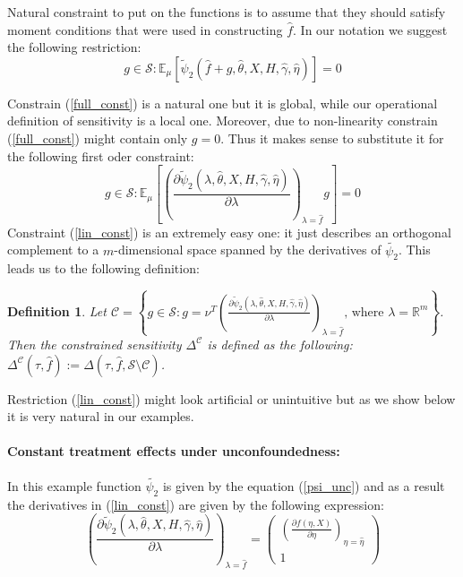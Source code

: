 \documentclass[12pt]{article}
\theoremstyle{plain}
\newtheorem{definition}[theorem]{Definition}
\begin{document}
Natural constraint to put on the functions is to assume that they should satisfy moment conditions that were used in constructing $\hat f$. In our notation we suggest the following restriction:
\begin{equation}\label{full_const}
g\in \mathcal{S}:\mathbb{E}_{\mu}[\tilde{\psi}_2(\hat f + g,\hat\theta, X, H, \hat\gamma, \hat\eta)]= 0
\end{equation}

Constrain (\ref{full_const}) is a natural one but it is global, while our operational definition of sensitivity is a local one. Moreover, due to non-linearity constrain (\ref{full_const}) might contain only $g = 0$. Thus it makes sense to substitute it for the following first oder constraint:
\begin{equation}\label{lin_const}
g\in \mathcal{S}:\mathbb{E}_{\mu}\left[\left(\frac{\partial \tilde{\psi}_2(\lambda,\hat\theta, X, H, \hat\gamma, \hat\eta)}{\partial \lambda}\right)_{\lambda = \hat f}g\right]= 0
\end{equation}
Constraint (\ref{lin_const}) is an extremely easy one: it just describes an orthogonal complement to a $m$-dimensional space spanned by the derivatives of $\tilde{\psi_2}$.  This leads us to the following definition:

\begin{definition}
Let $\mathcal{C} = \left\{ g \in \mathcal{S}: g = \nu^T\left(\frac{\partial \tilde{\psi}_2(\lambda,\hat\theta, X, H, \hat\gamma, \hat\eta)}{\partial \lambda}\right)_{\lambda = \hat f} \text{, where $\lambda = \mathbb{R}^m$}\right\}$. Then the constrained sensitivity $\Delta^\mathcal{C}$ is defined as the following: $\Delta^\mathcal{C}(\tau,\hat f):= \Delta(\tau,\hat f,\mathcal{S}\setminus \mathcal{C})$.  
\end{definition} 

Restriction (\ref{lin_const}) might look artificial or unintuitive but as we show below it is very natural in our examples.

\paragraph{Constant treatment effects under unconfoundedness:} In this example function $\tilde{\psi_2}$ is given by the equation (\ref{psi_unc}) and as a result the derivatives in (\ref{lin_const}) are given by the following expression: 
\begin{equation}
\left(\frac{\partial \tilde{\psi}_2(\lambda,\hat\theta, X, H, \hat\gamma, \hat\eta)}{\partial \lambda}\right)_{\lambda = \hat f} =
\begin{pmatrix}
\left(\frac{\partial f(\eta, X)}{\partial \eta}\right)_{\eta = \hat \eta}\\
1
\end{pmatrix}
\end{equation}
\end{document}

